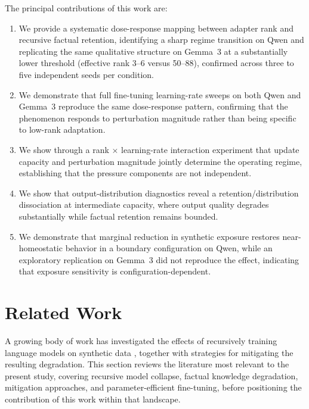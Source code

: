 \documentclass[a4paper,fleqn]{cas-dc}
\begin{document}
The principal contributions of this work are:
\begin{enumerate}
    \item We provide a systematic dose-response mapping between adapter rank and
    recursive factual retention, identifying a sharp regime transition on Qwen
    and replicating the same qualitative structure on Gemma~3 at a
    substantially lower threshold (effective rank 3--6 versus 50--88),
    confirmed across three to five independent seeds per condition.
    \item We demonstrate that full fine-tuning learning-rate sweeps on both
    Qwen and Gemma~3 reproduce the same dose-response pattern, confirming that
    the phenomenon responds to perturbation magnitude rather than being
    specific to low-rank adaptation.
    \item We show through a rank $\times$ learning-rate interaction experiment
    that update capacity and perturbation magnitude jointly determine the
    operating regime, establishing that the pressure components are not
    independent.
    \item We show that output-distribution diagnostics reveal a
    retention/distribution dissociation at intermediate capacity, where output
    quality degrades substantially while factual retention remains bounded.
    \item We demonstrate that marginal reduction in synthetic exposure restores
    near-homeostatic behavior in a boundary configuration on Qwen, while an
    exploratory replication on Gemma~3 did not reproduce the effect,
    indicating that exposure sensitivity is configuration-dependent.
\end{enumerate}

\section{Related Work}\label{sec:related}

A growing body of work has investigated the effects of recursively training
language models on synthetic data \citep{villalobos2024}, together with
strategies for mitigating the resulting degradation. This section reviews the
literature most relevant to the present study, covering recursive model
collapse, factual knowledge degradation, mitigation approaches, and
parameter-efficient fine-tuning, before positioning the contribution of this
work within that landscape.
\end{document}
